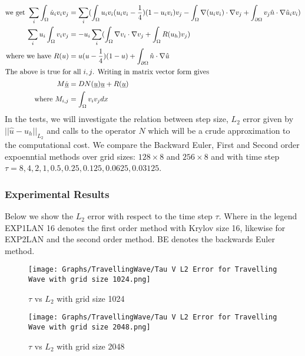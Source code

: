 \begin{align*}
    \text{we get } \sum_i\int_{\Omega} \dot u_i v_i v_j &=\sum_i(\int_{\Omega} u_iv_i(u_iv_i-\frac14)(1-u_iv_i)v_j - \int_{\Omega}\nabla (u_iv_i) \cdot \nabla v_j + \int_{\partial\Omega}  v_j\hat n \cdot \nabla \hat u_iv_i)\\
    \sum_iu_i\int_{\Omega}v_iv_j &= -u_i\sum_i(\int_{\Omega}\nabla v_i \cdot \nabla v_j + \int_{\Omega}R(u_h)v_j)\\
    \text{where we have } R(u)&=u(u-\frac14)(1-u) + \int_{\partial\Omega}  \hat n \cdot \nabla \hat  u\\
    \intertext{The above is true for all $i,j$. Writing in matrix vector form gives}
    M \underline{\dot u} &= DN(\underline{u})\underline{u} + R(\underline{u})\\
    \text{where } M_{i,j} &= \int_{\Omega}v_iv_jdx
\end{align*}
In the tests, we will investigate the relation between step size, $L_2$ error given by $||\hat u - u_h||_{L_2}$ and calls to the operator $N$ which will be a crude approximation to the computational cost.
We compare the Backward Euler, First and Second order expoenntial methods over grid sizes: $128 \times 8$ and $256 \times 8$ and with time step $\tau=8,4,2,1,0.5,0.25,0.125,0.0625,0.03125$.

\subsubsection{Experimental Results}

Below we show the $L_2$ error with respect to the time step $\tau$.
Where in the legend EXP1LAN 16 denotes the first order method with Krylov size 16, likewise for EXP2LAN and the second order method.
BE denotes the backwards Euler method.

\begin{figure}[H]
    \centering
    \begin{minipage}{0.49\textwidth}
        \texttt{[image: Graphs/TravellingWave/Tau V L2 Error for Travelling Wave with grid size 1024.png]} %
        \caption{$\tau$ vs $L_2$ with grid size 1024}
        \label{fig:plot1}
    \end{minipage}\hfill
    \centering
    \begin{minipage}{0.49\textwidth}
        \texttt{[image: Graphs/TravellingWave/Tau V L2 Error for Travelling Wave with grid size 2048.png]} %
        \caption{$\tau$ vs $L_2$ with grid size 2048}
        \label{fig:plot2}
    \end{minipage}\hfill
\end{figure}

